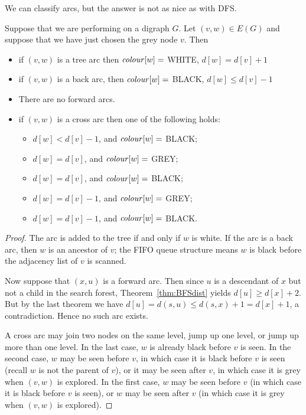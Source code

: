 We can classify arcs, but the answer is not as nice as with DFS.

\begin{Theorem}
\label{thm:BFS-arcclass}
Suppose that we are performing  on a digraph $G$. Let $(v,
w)\in E(G)$ and suppose that we have just chosen the grey node $v$. 
Then
\begin{itemize}
\item
if $(v, w)$ is a tree arc then $\operatorname{\text{\textit{colour}}}[w] = $ WHITE, $d[w] = d[v] + 1$
\item
if $(v, w)$ is a back arc, then $\operatorname{\text{\textit{colour}}}[w] = $ BLACK, $d[w] \leq d[v] - 1$  
\item
There are no forward arcs.
\item
if $(v, w)$ is a cross arc then one of the following holds:
\begin{itemize}
\item $d[w] < d[v] - 1$, and $\operatorname{\text{\textit{colour}}}[w] = $ BLACK;
\item $d[w] = d[v]$, and $\operatorname{\text{\textit{colour}}}[w] = $ GREY;
\item $d[w] = d[v]$, and $\operatorname{\text{\textit{colour}}}[w] = $ BLACK;
\item $d[w] = d[v] - 1$, and $\operatorname{\text{\textit{colour}}}[w] = $ GREY;
\item $d[w] = d[v] - 1$, and $\operatorname{\text{\textit{colour}}}[w] = $ BLACK.
\end{itemize}
\end{itemize}
\end{Theorem}

\begin{proof}
The arc is added to the tree if and only if $w$ is white. If the arc is
a back arc, then $w$ is an ancestor of $v$; the FIFO queue structure
means $w$ is black before the adjacency list of $v$ is scanned. 

Now suppose that $(x, u)$ is a forward arc. Then since $u$ is a
descendant of $x$ but not a child in the search forest, 
Theorem~\ref{thm:BFSdist} yields $d[u]
\geq d[x] + 2$. But by the last theorem we have $d[u] = d(s, u) \leq
d(s, x) + 1 = d[x] + 1$, a contradiction. Hence no such arc exists.

A cross arc may join two nodes on the same level, jump up one level,
or jump up more than one level. In the last case, $w$ is already black
before $v$ is seen. In the second case, $w$ may be seen before $v$,
in which case it is black before $v$ is seen (recall $w$ is not the
parent of $v$), or it may be seen after $v$, in which case it is grey
when $(v, w)$ is explored. In the first case, $w$ may be seen before $v$ (in
which case it is black before $v$ is seen), or $w$ may be seen after $v$
(in which case it is grey when $(v, w)$ is explored).
\end{proof}

